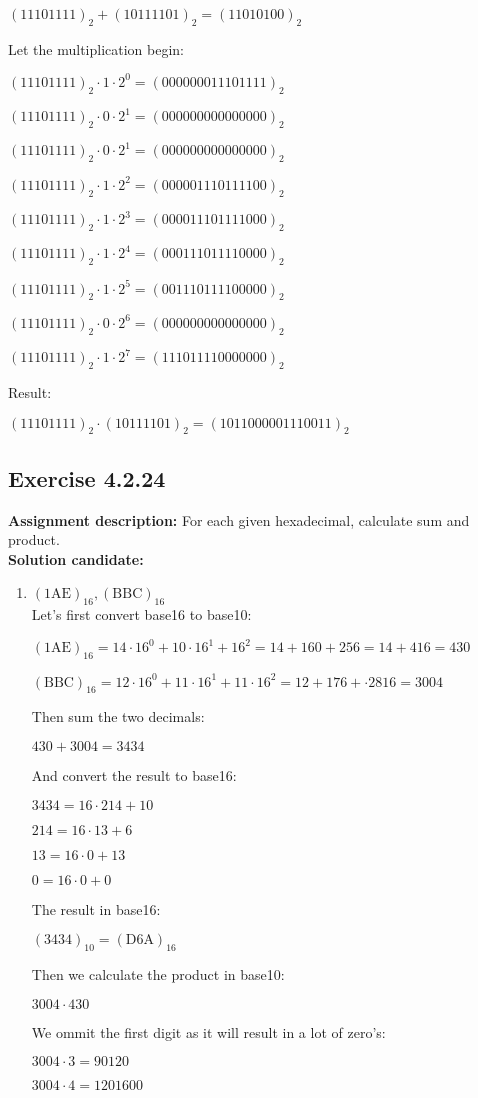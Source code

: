 \documentclass{report}
\newcommand{\cent}[1]{\begin{center}#1\end{center}}
\newcommand{\assignmentDescription}{\textbf{Assignment description: }}
\newcommand{\solution}{\textbf{Solution candidate: }}
\newcommand{\Exercise}[1]{\subsection{Exercise #1}}
\newcommand{\defaultEnumerateLabel}{\textbf{\alph*.}}
\newcommand{\myItem}[1]{\item #1\\}
\newcommand{\decimal}[1]{(#1)_{10}}
\newcommand{\binary}[1]{(#1)_2}
\newcommand{\hexadec}[1]{(\text{#1})_{16}}
\begin{document}
\begin{enumerate}[label=\defaultEnumerateLabel]
\begin{enumerate}[label=\defaultEnumerateLabel]
		\cent{$\binary{11101111} + \binary{10111101} = \binary{11010100}$}
		Let the multiplication begin:
		\cent{$\binary{11101111} \cdot 1 \cdot 2^0 = \binary{000000011101111}$}
		\cent{$\binary{11101111} \cdot 0 \cdot 2^1 = \binary{000000000000000}$}
		\cent{$\binary{11101111} \cdot 0 \cdot 2^1 = \binary{000000000000000}$}
		\cent{$\binary{11101111} \cdot 1 \cdot 2^2 = \binary{000001110111100}$}
		\cent{$\binary{11101111} \cdot 1 \cdot 2^3 = \binary{000011101111000}$}
		\cent{$\binary{11101111} \cdot 1 \cdot 2^4 = \binary{000111011110000}$}
		\cent{$\binary{11101111} \cdot 1 \cdot 2^5 = \binary{001110111100000}$}
		\cent{$\binary{11101111} \cdot 0 \cdot 2^6 = \binary{000000000000000}$}
		\cent{$\binary{11101111} \cdot 1 \cdot 2^7 = \binary{111011110000000}$}
		
		Result:
		
		\cent{$\binary{11101111} \cdot \binary{10111101} = \binary{1011000001110011}$}
		
	\end{enumerate}
	\Exercise{4.2.24}
	\assignmentDescription
	For each given hexadecimal, calculate sum and product. \\
	
	\solution
	
	\begin{enumerate}[label = \defaultEnumerateLabel]
		\myItem{$\hexadec{1AE}, \hexadec{BBC}$}
		
		Let's first convert base16 to base10:
		
		\cent{$\hexadec{1AE} = 14 \cdot 16^0 + 10 \cdot 16^1 + 16^2 =  14 + 160 + 256 = 14 + 416 = 430$}
		\cent{$\hexadec{BBC} = 12 \cdot 16^0 + 11 \cdot 16^1 + 11 \cdot  16^2 = 12 + 176+ \cdot 2816 = 3004$}
		
		Then sum the two decimals:
		
		\cent{$430+3004 = 3434$}
		
		And convert the result to base16:
		
		\cent{$3434 = 16 \cdot 214 + 10$}
		\cent{$214 = 16 \cdot 13 + 6 $}
		\cent{$13 = 16 \cdot 0 + 13 $}
		\cent{$0 = 16 \cdot 0 + 0$}
		
		The result in base16:
		
		\cent{$\decimal{3434} = \hexadec{D6A}$}
		
		Then we calculate the product in base10:
		
		\cent{$3004 \cdot 430$}
		
		We ommit the first digit as it will result in a lot of zero's:
		
		\cent{$3004 \cdot 3 = 90120$}
		\cent{$3004 \cdot 4 = 1201600$}
		

\end{enumerate}
\end{enumerate}
\end{document}
